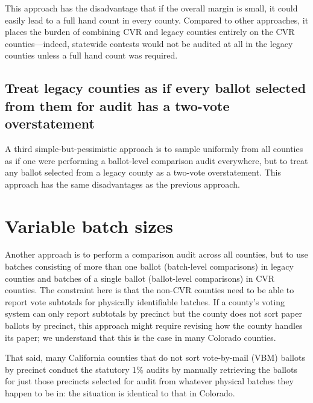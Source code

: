 \documentclass[12pt]{article}
\begin{document}
This approach has the disadvantage that if the overall margin is small, 
it could easily lead to a full hand count in every county.
Compared to other approaches, it places the burden of combining CVR and legacy counties
entirely on the CVR counties---indeed, statewide contests would not be audited at all in the 
legacy counties unless a full hand count was required. 

\subsection{Treat legacy counties as if every ballot selected from them for audit has a two-vote overstatement}
A third simple-but-pessimistic approach is to sample uniformly from all counties as if one
were performing a ballot-level comparison audit everywhere,  but to 
treat any ballot
selected from a legacy county as a two-vote overstatement.
This approach has the same disadvantages as the previous approach.

\section{Variable batch sizes}

Another approach is to perform a comparison audit across all counties, but to use batches consisting
of more than one ballot (batch-level comparisons)
in legacy counties and batches of a single ballot (ballot-level comparisons) in CVR counties.
The constraint here is that the non-CVR counties need to be able to report vote subtotals
for physically identifiable batches.
If a county's voting system can only report subtotals by precinct but 
the county does not sort paper ballots by
precinct, this approach might require revising how the county handles its
paper; we understand that this is the case in many Colorado counties.

That said, many California counties that do not sort vote-by-mail (VBM)
ballots by precinct conduct the statutory 1\% audits by manually retrieving the ballots 
for just those precincts selected for audit from whatever physical batches they happen to be in: 
the situation is identical to that in Colorado.
\end{document}
